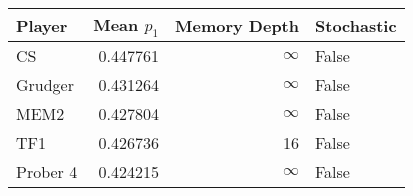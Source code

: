 \begin{tabular}{lrrl}
\toprule
   Player &  Mean $p_1$ &  Memory Depth & Stochastic \\
\midrule
       CS &    0.447761 &            \(\infty\) &      False \\
  Grudger &    0.431264 &            \(\infty\) &      False \\
     MEM2 &    0.427804 &            \(\infty\) &      False \\
      TF1 &    0.426736 &            16 &      False \\
 Prober 4 &    0.424215 &            \(\infty\) &      False \\
\bottomrule
\end{tabular}

